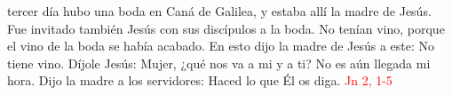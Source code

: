 tercer día hubo una boda en Caná de Galilea, y estaba allí la madre de Jesús. Fue invitado también Jesús con sus discípulos a la boda.
No tenían vino, porque el vino de la boda se había acabado. En esto dijo la madre de Jesús a este: No tiene vino. Díjole Jesús: Mujer,
¿qué nos va a mi y a ti? No es aún llegada mi hora. Dijo la madre a los servidores: Haced lo que Él os diga. \textcolor{red}{Jn 2, 1-5}
